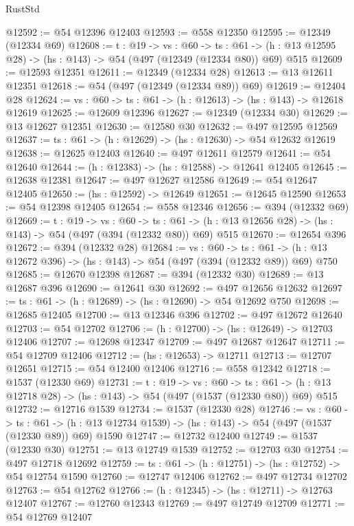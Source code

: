 \begin{lexlean}{RustStd}
\begin{coremodule}
@12592 := @54 @12396 @12403
@12593 := @558 @12350
@12595 := @12349 (@12334 @69)
@12608 := {t : @19} ->
  {vs : @60} ->
  {ts : @61} -> (h : @13 @12595 @28) -> (hs : @143) -> @54 (@497 (@12349 (@12334 @80)) @69) @515
@12609 := @12593 @12351
@12611 := @12349 (@12334 @28)
@12613 := @13 @12611 @12351
@12618 := @54 (@497 (@12349 (@12334 @89)) @69)
@12619 := @12404 @28
@12624 := {vs : @60} -> {ts : @61} -> (h : @12613) -> (hs : @143) -> @12618 @12619
@12625 := @12609 @12396
@12627 := @12349 (@12334 @30)
@12629 := @13 @12627 @12351
@12630 := @12580 @30
@12632 := @497 @12595 @12569
@12637 := {ts : @61} -> (h : @12629) -> (hs : @12630) -> @54 @12632 @12619
@12638 := @12625 @12403
@12640 := @497 @12611 @12579
@12641 := @54 @12640
@12644 := (h : @12383) -> (hs : @12588) -> @12641 @12405
@12645 := @12638 @12381
@12647 := @497 @12627 @12586
@12649 := @54 @12647 @12405
@12650 := (hs : @12592) -> @12649
@12651 := @12645 @12590
@12653 := @54 @12398 @12405
@12654 := @558 @12346
@12656 := @394 (@12332 @69)
@12669 := {t : @19} ->
  {vs : @60} ->
  {ts : @61} -> (h : @13 @12656 @28) -> (hs : @143) -> @54 (@497 (@394 (@12332 @80)) @69) @515
@12670 := @12654 @396
@12672 := @394 (@12332 @28)
@12684 := {vs : @60} ->
  {ts : @61} -> (h : @13 @12672 @396) -> (hs : @143) -> @54 (@497 (@394 (@12332 @89)) @69) @750
@12685 := @12670 @12398
@12687 := @394 (@12332 @30)
@12689 := @13 @12687 @396
@12690 := @12641 @30
@12692 := @497 @12656 @12632
@12697 := {ts : @61} -> (h : @12689) -> (hs : @12690) -> @54 @12692 @750
@12698 := @12685 @12405
@12700 := @13 @12346 @396
@12702 := @497 @12672 @12640
@12703 := @54 @12702
@12706 := (h : @12700) -> (hs : @12649) -> @12703 @12406
@12707 := @12698 @12347
@12709 := @497 @12687 @12647
@12711 := @54 @12709 @12406
@12712 := (hs : @12653) -> @12711
@12713 := @12707 @12651
@12715 := @54 @12400 @12406
@12716 := @558 @12342
@12718 := @1537 (@12330 @69)
@12731 := {t : @19} ->
  {vs : @60} ->
  {ts : @61} -> (h : @13 @12718 @28) -> (hs : @143) -> @54 (@497 (@1537 (@12330 @80)) @69) @515
@12732 := @12716 @1539
@12734 := @1537 (@12330 @28)
@12746 := {vs : @60} ->
  {ts : @61} -> (h : @13 @12734 @1539) -> (hs : @143) -> @54 (@497 (@1537 (@12330 @89)) @69) @1590
@12747 := @12732 @12400
@12749 := @1537 (@12330 @30)
@12751 := @13 @12749 @1539
@12752 := @12703 @30
@12754 := @497 @12718 @12692
@12759 := {ts : @61} -> (h : @12751) -> (hs : @12752) -> @54 @12754 @1590
@12760 := @12747 @12406
@12762 := @497 @12734 @12702
@12763 := @54 @12762
@12766 := (h : @12345) -> (hs : @12711) -> @12763 @12407
@12767 := @12760 @12343
@12769 := @497 @12749 @12709
@12771 := @54 @12769 @12407

\end{coremodule}
\end{lexlean}
